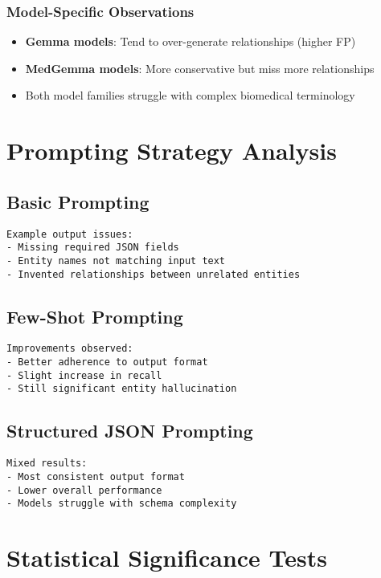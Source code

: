\subsubsection{Model-Specific Observations}
\begin{itemize}
    \item \textbf{Gemma models}: Tend to over-generate relationships (higher FP)
    \item \textbf{MedGemma models}: More conservative but miss more relationships
    \item Both model families struggle with complex biomedical terminology
\end{itemize}

\section{Prompting Strategy Analysis}

\subsection{Basic Prompting}
\begin{verbatim}
Example output issues:
- Missing required JSON fields
- Entity names not matching input text
- Invented relationships between unrelated entities
\end{verbatim}

\subsection{Few-Shot Prompting}
\begin{verbatim}
Improvements observed:
- Better adherence to output format
- Slight increase in recall
- Still significant entity hallucination
\end{verbatim}

\subsection{Structured JSON Prompting}
\begin{verbatim}
Mixed results:
- Most consistent output format
- Lower overall performance
- Models struggle with schema complexity
\end{verbatim}

\section{Statistical Significance Tests}

